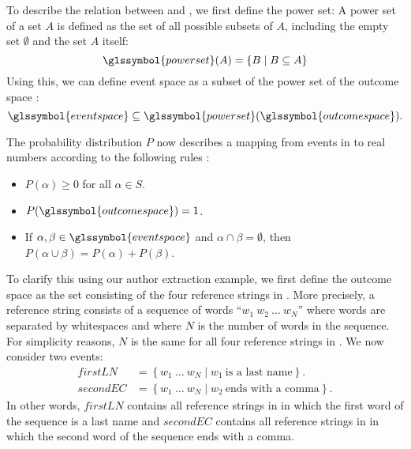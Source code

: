 To describe the relation between  and , we first define the \gls{power set}:
A \gls{power set} of a set $A$ is defined as the set of all possible subsets of $A$, including the empty set $\emptyset$ and the set $A$ itself:
\begin{equation}
  \label{equ:power-set}
  \glssymbol{power set}(A)=\left\{B\mid B\subseteq A\right\}
\end{equation}
Using this, we can define \gls{event space}  as a subset of the \gls{power set} of the \gls{outcome space} :
\begin{equation*}
  \glssymbol{event space}\subseteq\glssymbol{power set}(\glssymbol{outcome space}).
\end{equation*}


The \gls{probability distribution} $P$ now describes a mapping from \glspl{event} in  to real numbers according to the following rules \citep{koller2009probabilistic}:
\begin{itemize}
  \item $P(\alpha)\geq 0 $ for all $ \alpha \in S$.
  \item $P(\glssymbol{outcome space})=1$.
  \item If $\alpha,\beta\in \glssymbol{event space}$ and $\alpha\cap\beta = \emptyset$, then $P(\alpha\cup\beta)=P(\alpha)+P(\beta)$.
\end{itemize}

To clarify this using our author extraction example, we first define the \gls{outcome space}  as the set consisting of the four reference strings in .
More precisely, a reference string consists of a sequence of words ``$w_1\ w_2\ \dots\ w_N$'' where words are separated by whitespaces and where $N$ is the number of words in the sequence.
For simplicity reasons, $N$ is the same for all four reference strings in .
We now consider two \glspl{event}:
\begin{equation*}
  \begin{split}
    \mathit{firstLN}&=\left\{w_1\ \dots\ w_N \mid w_1\ \text{is a last name}\right\}.\\
    \mathit{secondEC}&=\left\{w_1\ \dots\ w_N \mid w_2\ \text{ends with a comma}\right\}.
  \end{split}
\end{equation*}
In other words, $\mathit{firstLN}$ contains all reference strings in  in which the first word of the sequence is a last name and $\mathit{secondEC}$ contains all reference strings in  in which the second word of the sequence ends with a comma.

